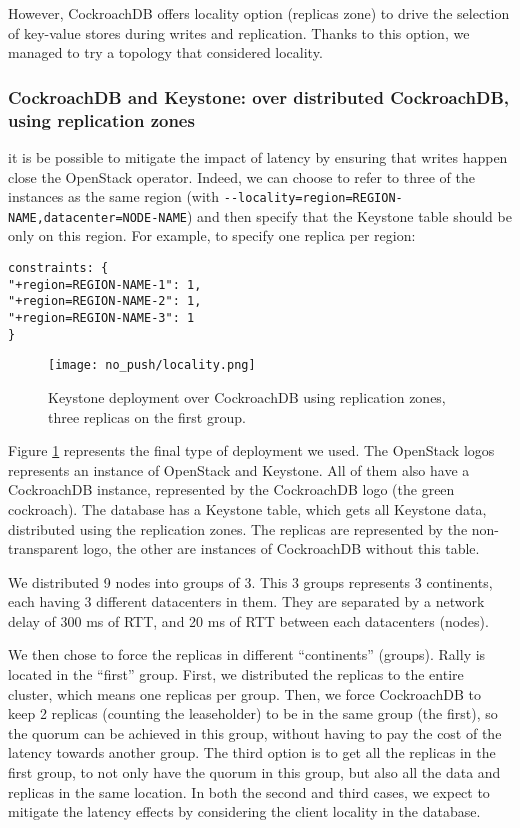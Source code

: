 However, CockroachDB offers locality option (replicas zone) to drive the selection of key-value stores during writes and replication. Thanks to this option, we managed to try a topology that considered locality.


\subsubsection{CockroachDB and Keystone: over distributed CockroachDB, using replication zones}
\label{subsubsec:replication-zones}
 it is be possible to mitigate the impact of latency by ensuring that writes happen close the OpenStack operator. Indeed, we can choose to refer to three of the instances as the same region (with \verb+--locality=region=REGION-NAME,datacenter=NODE-NAME+) and then specify that the Keystone table should be only on this region. For example, to specify one replica per region:
\begin{verbatim}
constraints: {
"+region=REGION-NAME-1": 1,
"+region=REGION-NAME-2": 1,
"+region=REGION-NAME-3": 1
}
\end{verbatim}

\begin{figure}
  \begin{center}
    \texttt{[image: no\_push/locality.png]}
  \end{center}
  \vspace{-20pt}
  \caption{Keystone deployment over CockroachDB using replication zones, three replicas on the first group.}
  \vspace{-15pt}
  \label{fig:locality}
\end{figure}


Figure \ref{fig:locality} represents the final type of deployment we used. The OpenStack logos represents an instance of OpenStack and Keystone. All of them also have a CockroachDB instance, represented by the CockroachDB logo (the green cockroach). The database has a Keystone table, which gets all Keystone data, distributed using the replication zones. The replicas are represented by the non-transparent logo, the other are instances of CockroachDB without this table.

We distributed 9 nodes into groups of 3. This 3 groups represents 3 continents, each having 3 different datacenters in them. They are separated by a network delay of 300 ms of RTT, and 20 ms of RTT between each datacenters (nodes).

We then chose to force the replicas in different ``continents'' (groups). Rally is located in the ``first'' group. First, we distributed the replicas to the entire cluster, which means one replicas per group. Then, we force CockroachDB to keep 2 replicas (counting the leaseholder) to be in the same group (the first), so the quorum can be achieved in this group, without having to pay the cost of the latency towards another group. The third option is to get all the replicas in the first group, to not only have the quorum in this group, but also all the data and replicas in the same location. In both the second and third cases, we expect to mitigate the latency effects by considering the client locality in the database.


